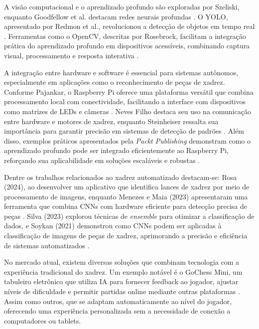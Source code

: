 \documentclass[journal]{IEEEtran} %
\begin{document}
A visão computacional e o aprendizado profundo são exploradas por Szeliski, enquanto Goodfellow et al. destacam redes neurais profundas \cite{szeliski2010,goodfellow2016}. O YOLO, apresentado por Redmon et al., revolucionou a detecção de objetos em tempo real \cite{redmon2016yolo}. Ferramentas como o OpenCV, descritas por Rosebrock, facilitam a integração prática do aprendizado profundo em dispositivos acessíveis, combinando captura visual, processamento e resposta interativa \cite{redmon2016yolo}.

A integração entre hardware e software é essencial para sistemas autônomos, especialmente em aplicações como o reconhecimento de peças de xadrez. Conforme Pajankar, o Raspberry Pi oferece uma plataforma versátil que combina processamento local com conectividade, facilitando a interface com dispositivos como matrizes de LEDs e câmeras \cite{pajankar2015}. Neves Filho destaca seu uso na comunicação entre hardware e motores de xadrez, enquanto Steinheiser ressalta sua importância para garantir precisão em sistemas de detecção de padrões \cite{nevesfilho2021xadrez,steinheiser2020}. Além disso, exemplos práticos apresentados pela \textit{Packt Publishing} demonstram como o aprendizado profundo pode ser integrado eficientemente ao Raspberry Pi, reforçando sua aplicabilidade em soluções escaláveis e robustas \cite{packt2024}.

Dentre os trabalhos relacionados ao xadrez automatizado destacam-se: Rosa (2024), ao desenvolver um aplicativo que identifica lances de xadrez por meio de processamento de imagens, enquanto Menezes e Maia (2023) apresentaram uma ferramenta que combina CNNs com hardware eficiente para detecção precisa de peças \cite{rosa2024,menezes2023}. Silva (2023) explorou técnicas de \textit{ensemble} para otimizar a classificação de dados, e Soykan (2021) demonstrou como CNNs podem ser aplicadas à classificação de imagens de peças de xadrez, aprimorando a precisão e eficiência de sistemas automatizados \cite{silva2023ensemble,soykan2021}.

No mercado atual, existem diversas soluções que combinam tecnologia com a experiência tradicional do xadrez. Um exemplo notável é o GoChess Mini, um tabuleiro eletrônico que utiliza IA para fornecer feedback ao jogador, ajustar níveis de dificuldade e permitir partidas online mediante outras plataformas \cite{gochessmini2024}. Assim como outros, que se adaptam automaticamente ao nível do jogador, oferecendo uma experiência personalizada sem a necessidade de conexão a computadores ou tablets.
\end{document}
